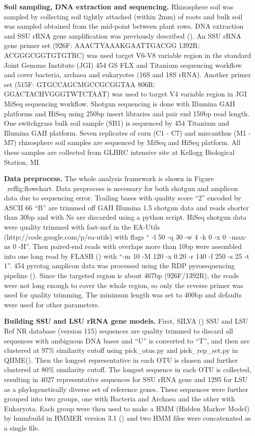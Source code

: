 \documentclass[12pt]{article}
\begin{document}
  {\bf Soil sampling, DNA extraction and sequencing. }
Rhizosphere soil was sampled by collecting soil tightly attached (within 2mm) of roots and bulk soil was sampled obtained from the mid-point between plant rows. DNA extraction and SSU rRNA gene amplification was previously described (\cite{ed2010}). An SSU rRNA gene primer set (926F: AAACTYAAAKGAATTGACGG 1392R: ACGGGCGGTGTGTRC) was used target V6-V8 variable region in the standard Joint Genome Institute (JGI) 454 GS FLX and Titanium sequencing workflow and cover bacteria, archaea and eukaryotes (16S and 18S rRNA). Another primer set (515F: GTGCCAGCMGCCGCGGTAA 806R: GGACTACHVGGGTWTCTAAT) was used to target V4 variable region in JGI MiSeq sequencing workflow. Shotgun sequencing is done with Illumina GAII platforms and HiSeq using 250bp insert libraries and pair end 150bp read length. One switchgrass bulk soil sample (SB1) is sequenced by 454 Titanium and Illumina GAII platform. Seven replicates of corn (C1 - C7) and miscanthus (M1 - M7) rhizosphere soil samples are sequenced by MiSeq and HiSeq platform. All these samples are collected from GLBRC intensive site at  Kellogg Biological Station, MI.

  {\bf Data preprocess. }
  The whole analysis framework is shown in Figure ~ref{fig:flowchart}. Data preprocess is necessary for both shotgun and amplicon data due to sequencing error. Trailing bases with quality score ``2'' encoded by ASCII 66 ``B'' are trimmed off GAII Illumina 1.5 shotgun data and reads shorter than 30bp and with Ns are discarded using a python script. HiSeq shotgun data were quality trimmed with fast-mcf in the EA-Utils (http://code.google.com/p/ea-utils) with flags `` -l 50 -q 30 -w 4 -k 0 -x 0 --max-ns 0 -H''. Then paired-end reads with overlaps more than 10bp were assembled into one long read by FLASH (\cite{flash2011}) with ``-m 10 -M 120 -x 0.20 -r 140 -f 250 -s 25 -t 1''. 454 pyrotag amplicon data was processed using the RDP pyrosequencing pipeline (\cite{rdp2009}). Since the targeted region is about 467bp (926F/1392R), the reads were not long enough to cover the whole region, so only the reverse primer was used for quality trimming. The minimum length was set to 400bp and defaults were used for other parameters.

  {\bf Building SSU and LSU rRNA gene models. }
First, SILVA (\cite{silva2013}) SSU and LSU Ref NR database (version 115) sequences are quality trimmed to discard all sequences with ambiguous DNA bases and ``U'' is converted to ``T'', and then are clustered at 97\% similarity cutoff using pick\_otus.py and pick\_rep\_set.py in QIIME(\cite{qiime}). Then the longest representative in each OTU is chosen and further clustered at 80\% similarity cutoff. The longest sequence in each OTU is collected, resulting in 4027 representative sequences for SSU rRNA gene and 1295 for LSU as a phylogenetically diverse set of reference genes. These sequences were further grouped into two groups, one with Bacteria and Archaea and the other with Eukaryota. Each group were then used to make a HMM (Hidden Markov Model) by hmmbuild in HMMER version 3.1 (\cite{hmmer3}) and two HMM files were concatenated as a single file.
\end{document}
